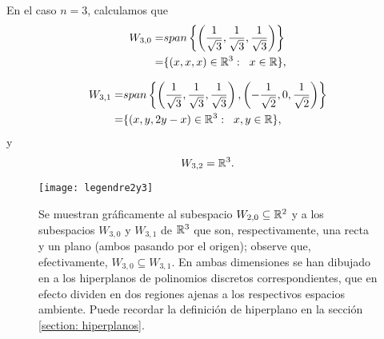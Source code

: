 \begin{ej}
En el caso $n=3$, calculamos que
\begin{align*}
W_{3,0}= & span \left\{
\left( \frac{1}{\sqrt3}, \frac{1}{\sqrt3},
\frac{1}{\sqrt3} \right) \right\}  \\
= & \{ (x,x,x) \in \mathbb{R}^{3}: \hspace{0.2cm} x \in \mathbb{R} \},
\end{align*}

\begin{align}
\label{eq2: 1Dic}
W_{3,1}= & span \left\{ \left( \frac{1}{\sqrt3}, \frac{1}{\sqrt3},
\frac{1}{\sqrt3} \right) ,
\left( -\frac{1}{\sqrt2}, 0,  \frac{1}{\sqrt2} \right) \right\}
\nonumber \\
= & \{ (x,y,2y-x) \in \mathbb{R}^{3}: \hspace{0.2cm} x,y \in \mathbb{R} \},
\end{align}
y
\[
W_{3,2}=\mathbb{R}^{3}.
\]

	\begin{figure}[H]
	\centering\captionsetup{format = hang}
		\begin{measuredfigure}
			\texttt{[image:  legendre2y3]} 
			\caption{
			Se muestran gráficamente al subespacio
			$W_{2,0} \subseteq \mathbb{R}^{2}$
			y a los subespacios $W_{3,0}$ y $W_{3,1}$ de $\mathbb{R}^{3}$ que
			son, respectivamente, una recta y un plano (ambos pasando
			por el origen); observe que, efectivamente,
			$W_{3,0} \subseteq W_{3,1}$. En ambas dimensiones se han 
			dibujado en {\color{ameMorado}{morado}} a los hiperplanos
			de polinomios discretos correspondientes, que en efecto
			dividen en dos regiones ajenas a los respectivos espacios 
			ambiente. Puede recordar la definición de hiperplano
			en la sección \ref{section: hiperplanos}.} 
	 	\end{measuredfigure}
	 \end{figure}	
\final
\end{ej}















